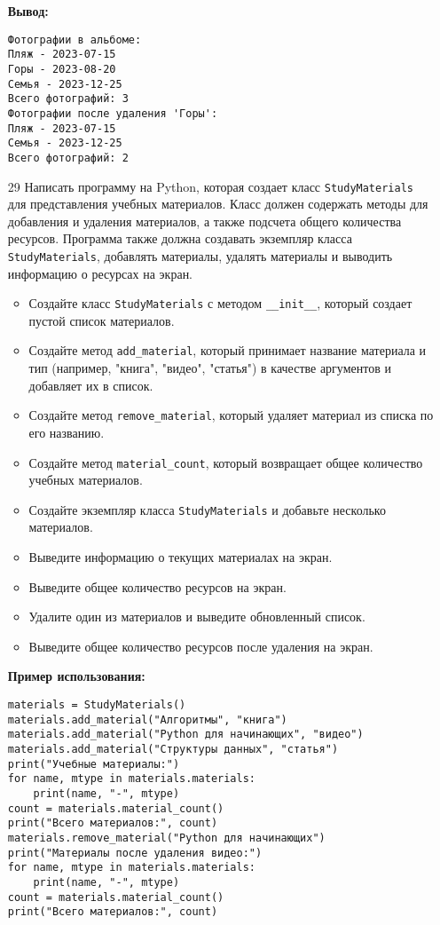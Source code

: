 \begin{enumerate}
\textbf{Вывод:}
\begin{verbatim}
Фотографии в альбоме:
Пляж - 2023-07-15
Горы - 2023-08-20
Семья - 2023-12-25
Всего фотографий: 3
Фотографии после удаления 'Горы':
Пляж - 2023-07-15
Семья - 2023-12-25
Всего фотографий: 2
\end{verbatim}

\item[29] Написать программу на Python, которая создает класс \texttt{StudyMaterials} для представления учебных материалов. Класс должен содержать методы для добавления и удаления материалов, а также подсчета общего количества ресурсов. Программа также должна создавать экземпляр класса \texttt{StudyMaterials}, добавлять материалы, удалять материалы и выводить информацию о ресурсах на экран.

\begin{itemize}
    \item Создайте класс \texttt{StudyMaterials} с методом \texttt{\_\_init\_\_}, который создает пустой список материалов.
    \item Создайте метод \texttt{add\_material}, который принимает название материала и тип (например, "книга", "видео", "статья") в качестве аргументов и добавляет их в список.
    \item Создайте метод \texttt{remove\_material}, который удаляет материал из списка по его названию.
    \item Создайте метод \texttt{material\_count}, который возвращает общее количество учебных материалов.
    \item Создайте экземпляр класса \texttt{StudyMaterials} и добавьте несколько материалов.
    \item Выведите информацию о текущих материалах на экран.
    \item Выведите общее количество ресурсов на экран.
    \item Удалите один из материалов и выведите обновленный список.
    \item Выведите общее количество ресурсов после удаления на экран.
\end{itemize}

\textbf{Пример использования:}

\begin{verbatim}
materials = StudyMaterials()
materials.add_material("Алгоритмы", "книга")
materials.add_material("Python для начинающих", "видео")
materials.add_material("Структуры данных", "статья")
print("Учебные материалы:")
for name, mtype in materials.materials:
    print(name, "-", mtype)
count = materials.material_count()
print("Всего материалов:", count)
materials.remove_material("Python для начинающих")
print("Материалы после удаления видео:")
for name, mtype in materials.materials:
    print(name, "-", mtype)
count = materials.material_count()
print("Всего материалов:", count)
\end{verbatim}


\end{enumerate}
